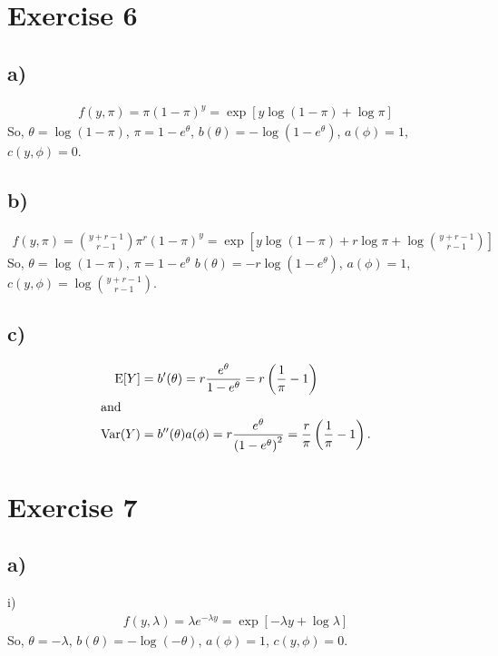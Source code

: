 \documentclass[a4paper]{article}
\newcommand{\E}{\mathrm{E}}
\newcommand{\Var}{\mathrm{Var}}
\begin{document}
\vspace{\baselineskip}
\section{Exercise 6}
\subsection{a)}
\begin{align*}
f(y,\pi) = \pi(1-\pi)^{y} = \exp\left[y \log(1-\pi) + \log\pi\right]
\end{align*}
So, $\theta = \log(1-\pi)$, $\pi = 1-e^{\theta}$, $b(\theta) = -\log\left(1-e^{\theta}\right)$, $a(\phi) = 1$, $c(y,\phi) = 0$.


\subsection{b)}
\begin{align*}
f(y,\pi) = \binom{y+r-1}{r-1}\pi^{r}(1-\pi)^{y} = \exp\left[y \log(1-\pi) + r\log\pi + \log\binom{y+r-1}{r-1}\right]
\end{align*}
So, $\theta = \log(1-\pi)$, $\pi = 1 -e^{\theta}$ $b(\theta) =-r\log\left(1-e^{\theta}\right)$, $a(\phi) = 1$, $c(y,\phi) = \log\binom{y+r-1}{r-1}$.\\

\subsection{c)}
\begin{align*}
\E[Y] &= b'(\theta) = r\frac{e^{\theta}}{1-e^{\theta}} = r\left(\frac{1}{\pi}-1\right)\\ \intertext{and}
\Var(Y) &= b''(\theta) a(\phi) = r\frac{e^{\theta}}{\left(1-e^{\theta}\right)^2} = \frac{r}{\pi}\left(\frac{1}{\pi}-1\right).
\end{align*}


\vspace{\baselineskip}
\section{Exercise 7}
\subsection{a)}
i)
\begin{align*}
f(y,\lambda) = \lambda e^{-\lambda y} = \exp\left[-\lambda y +\log\lambda\right]
\end{align*}
So, $\theta = -\lambda$, $b(\theta) = -\log(-\theta)$, $a(\phi) = 1$, $c(y,\phi) = 0$.\\
\end{document}
